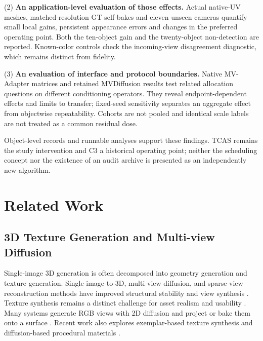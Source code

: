 \documentclass[times,twocolumn,final]{elsarticle}
\begin{document}
(2) \textbf{An application-level evaluation of those effects.} Actual native-UV meshes, matched-resolution GT self-bakes and eleven unseen cameras quantify small local gains, persistent appearance errors and changes in the preferred operating point. Both the ten-object gain and the twenty-object non-detection are reported. Known-color controls check the incoming-view disagreement diagnostic, which remains distinct from fidelity.

(3) \textbf{An evaluation of interface and protocol boundaries.} Native MV-Adapter matrices and retained MVDiffusion results test related allocation questions on different conditioning operators. They reveal endpoint-dependent effects and limits to transfer; fixed-seed sensitivity separates an aggregate effect from objectwise repeatability. Cohorts are not pooled and identical scale labels are not treated as a common residual dose.

Object-level records and runnable analyses support these findings. TCAS remains the study intervention and C3 a historical operating point; neither the scheduling concept nor the existence of an audit archive is presented as an independently new algorithm.

\section{Related Work}
\label{sec:related}

\subsection{3D Texture Generation and Multi-view Diffusion}
\label{subsec:3dtex}

Single-image 3D generation is often decomposed into geometry generation and texture generation. Single-image-to-3D, multi-view diffusion, and sparse-view reconstruction methods have improved structural stability and view synthesis \cite{liu2023zero1to3,shi2023zero123pp,liu2023syncdreamer,long2023wonder3d,shi2024mvdream,wang2023imagedream,xu2024instantmesh,ke2024era3d}. Texture synthesis remains a distinct challenge for asset realism and usability \cite{perla2026survey}. Many systems generate RGB views with 2D diffusion and project or bake them onto a surface \cite{chen2023text2tex,richardson2023texture,poole2023dreamfusion,chen2023fantasia3d}. Recent work also explores exemplar-based texture synthesis and diffusion-based procedural materials \cite{guzman2026adaptive,lv2025interpretable}.
\end{document}
